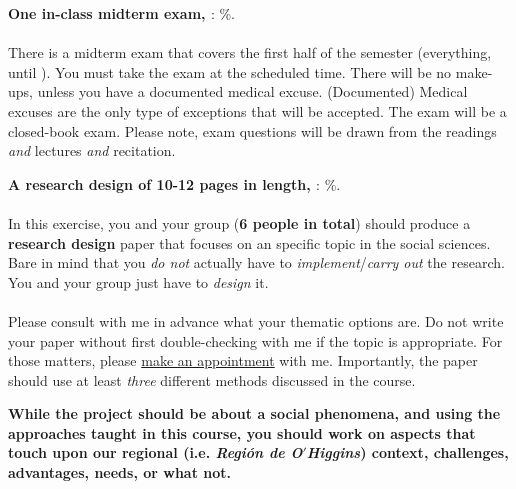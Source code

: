 \documentclass[letterpaper]{article}
\renewenvironment{itemize}{
  \begin{list}{}{
    \setlength{\leftmargin}{1.5em}
  }
}{
  \end{list}
}
\begin{document}
\begin{enumerate}
	\item {\bf One in-class midterm exam, \underline{{\unskip}}}: {\unskip}\%.
	\\ 
	\\
	There is a midterm exam that covers the first half of the semester (everything, until {\unskip}). You must take the exam at the scheduled time. There will be no make-ups, unless you have a documented medical excuse. (Documented) Medical excuses are the only type of exceptions that will be accepted. The exam will be a closed-book exam. Please note, exam questions will be drawn from the readings \emph{and} lectures \emph{and} recitation.


	\item {\bf A research design of 10-12 pages in length, \underline{{\unskip}}}: {\unskip}\%.
	\\ 
	\\
	In this exercise, you and your group ({\bf 6 people in total}) should produce a {\bf research design} paper that focuses on an specific topic in the social sciences. Bare in mind that you \emph{do not} actually have to \emph{implement}/\emph{carry out} the research. You and your group just have to \emph{design} it.
	\\
	\\
	Please consult with me in advance what your thematic options are. Do not write your paper without first double-checking with me if the topic is appropriate. For those matters, please \href{https://calendly.com/bahamonde/officehours}{make an appointment} with me. Importantly, the paper should use at least \emph{three} different methods discussed in the course.

	\begin{itemize}
	\item[\Pointinghand] {\bf While the project should be about a social phenomena, and using the approaches taught in this course, {\color{blue}you should work on aspects that touch upon our regional} (i.e. \emph{Regi\'on de O$'$Higgins}) {\color{blue}context, challenges, advantages, needs, or what not.}}
	\end{itemize}


\end{enumerate}
\end{document}
